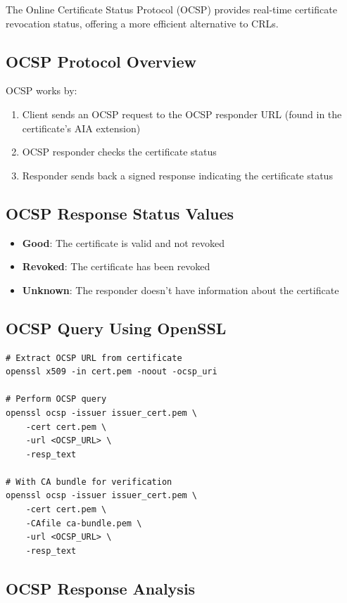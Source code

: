 \documentclass[12pt,a4paper]{article}
\begin{document}
The Online Certificate Status Protocol (OCSP) provides real-time certificate revocation status, offering a more efficient alternative to CRLs.

\subsection{OCSP Protocol Overview}

OCSP works by:
\begin{enumerate}
    \item Client sends an OCSP request to the OCSP responder URL (found in the certificate's AIA extension)
    \item OCSP responder checks the certificate status
    \item Responder sends back a signed response indicating the certificate status
\end{enumerate}

\subsection{OCSP Response Status Values}

\begin{itemize}
    \item \textbf{Good}: The certificate is valid and not revoked
    \item \textbf{Revoked}: The certificate has been revoked
    \item \textbf{Unknown}: The responder doesn't have information about the certificate
\end{itemize}

\subsection{OCSP Query Using OpenSSL}

\begin{lstlisting}[style=bashstyle, caption={OCSP query using OpenSSL}]
# Extract OCSP URL from certificate
openssl x509 -in cert.pem -noout -ocsp_uri

# Perform OCSP query
openssl ocsp -issuer issuer_cert.pem \
    -cert cert.pem \
    -url <OCSP_URL> \
    -resp_text

# With CA bundle for verification
openssl ocsp -issuer issuer_cert.pem \
    -cert cert.pem \
    -CAfile ca-bundle.pem \
    -url <OCSP_URL> \
    -resp_text
\end{lstlisting}

\subsection{OCSP Response Analysis}
\end{document}
